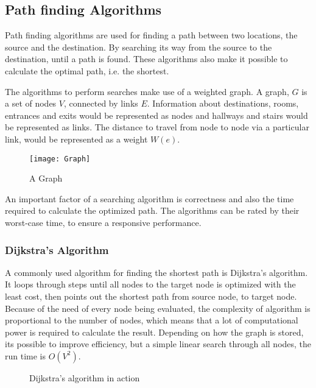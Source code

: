 \subsection{Path finding Algorithms}

  Path finding algorithms are used for finding a path between two locations, the source and the destination. By searching its way from the source to the destination, until a path is found. These algorithms also make it possible to calculate the optimal path, i.e. the shortest.

  The algorithms to perform searches make use of a weighted graph. A graph, $G$ is a set of nodes $V$, connected by links $E$.
  Information about destinations, rooms, entrances and exits would be represented as nodes and hallways and stairs would be represented as links. The distance to travel from node to node via a particular link, would be represented as a weight $W(e)$.

  \begin{figure}[ht!]
    \centering
    \texttt{[image: Graph]}
    \caption{A Graph}
    \label{overflow}
  \end{figure}

  An important factor of a searching algorithm is correctness and also the time required to calculate the optimized path.
  The algorithms can be rated by their worst-case time, to ensure a responsive performance.

  \subsubsection{Dijkstra's Algorithm}

  A commonly used algorithm for finding the shortest path is Dijkstra's algorithm. It loops through steps until all nodes to the target node is optimized with the least cost, then points out the shortest path from source node, to target node. Because of the need of every node being evaluated, the complexity of algorithm is proportional to the number of nodes, which means that a lot of computational power is required to calculate the result. Depending on how the graph is stored, its possible to improve efficiency, but a simple linear search through all nodes, the run time is $O(V^2)$. \cite{Dijkstra}

  \begin{figure}[ht!]
    \centering
    \caption{Dijkstra's algorithm in action}
    \label{overflow}
  \end{figure}

